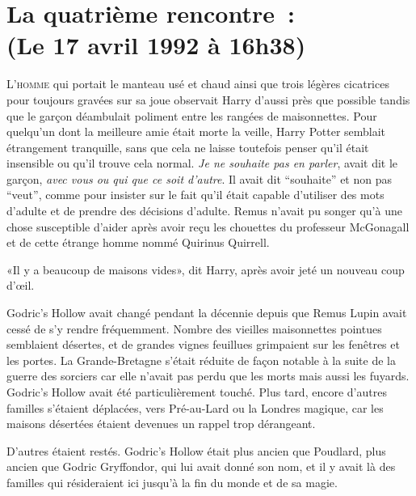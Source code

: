 
\section[La quatrième rencontre~:\\
(Le 17 avril 1992 à 16h38)]{La quatrième rencontre~:\\
(Le 17 avril 1992 à 16h38)\protect\footnotemark}

\lettrine{L}{'homme} qui portait le manteau usé et chaud ainsi que trois légères cicatrices pour toujours gravées sur sa joue observait Harry d'aussi près que possible tandis que le garçon déambulait poliment entre les rangées de maisonnettes. Pour quelqu'un dont la meilleure amie était morte la veille, Harry Potter semblait étrangement tranquille, sans que cela ne laisse toutefois penser qu'il était insensible ou qu'il trouve cela normal. \emph{Je ne souhaite pas en parler}, avait dit le garçon, \emph{avec vous ou qui que ce soit d'autre}. Il avait dit “souhaite” et non pas “veut”, comme pour insister sur le fait qu'il était capable d'utiliser des mots d'adulte et de prendre des décisions d'adulte. Remus n'avait pu songer qu'à une chose susceptible d'aider après avoir reçu les chouettes du professeur McGonagall et de cette étrange homme nommé Quirinus Quirrell.

«Il y a beaucoup de maisons vides», dit Harry, après avoir jeté un nouveau coup d'œil.

Godric's Hollow avait changé pendant la décennie depuis que Remus Lupin avait cessé de s'y rendre fréquemment. Nombre des vieilles maisonnettes pointues semblaient désertes, et de grandes vignes feuillues grimpaient sur les fenêtres et les portes. La Grande-Bretagne s'était réduite de façon notable à la suite de la guerre des sorciers car elle n'avait pas perdu que les morts mais aussi les fuyards. Godric's Hollow avait été particulièrement touché. Plus tard, encore d'autres familles s'étaient déplacées, vers Pré-au-Lard ou la Londres magique, car les maisons désertées étaient devenues un rappel trop dérangeant.

D'autres étaient restés. Godric's Hollow était plus ancien que Poudlard, plus ancien que Godric Gryffondor, qui lui avait donné son nom, et il y avait là des familles qui résideraient ici jusqu'à la fin du monde et de sa magie.

